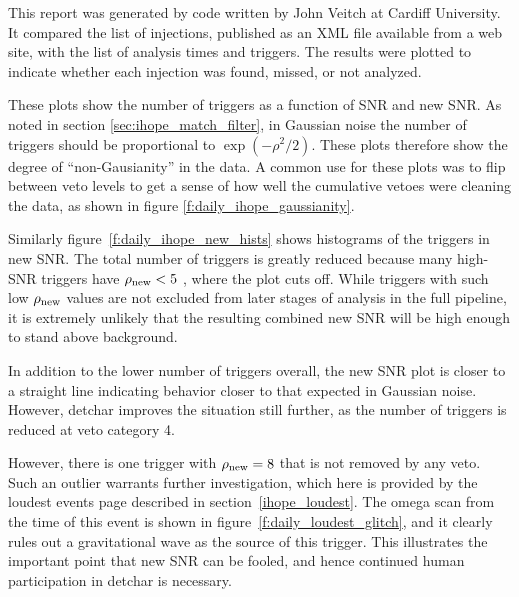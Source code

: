 
This report was generated by code written by John Veitch  at Cardiff
University.  It compared the list of injections, published as an XML
file available from a web site, with the list of analysis times and
triggers.  The results were plotted to indicate whether each injection
was found, missed, or not analyzed.



These plots show the number of triggers as a function of SNR and new
SNR.  As noted in section \ref{sec:ihope_match_filter}, in Gaussian
noise the number of triggers should be proportional to
$\exp(-\rho^2/2)$.  These plots therefore show the degree of
``non-Gausianity'' in the data.  A common use for these plots was to
flip between veto levels to get a sense of how well the cumulative
vetoes were cleaning the data, as shown in figure
\ref{f:daily_ihope_gaussianity}.

Similarly figure~\ref{f:daily_ihope_new_hists} shows histograms of the
triggers in new SNR.  The total number of triggers is greatly reduced
because many high-SNR triggers have $\rho_{\textrm{new}} < 5$ , where the
plot cuts off.  While triggers with such low $\rho_{\textrm{new}}$ values are not
excluded from later stages of analysis in the full pipeline, it is
extremely unlikely that the resulting combined new SNR will be high
enough to stand above background.

In addition to the lower number of triggers overall, the new SNR plot
is closer to a straight line indicating behavior closer to that
expected in Gaussian noise.  However, detchar improves the situation
still further, as the number of triggers is reduced at veto category
4.

However, there is one trigger with $\rho_{\textrm{new}} = 8$ that is not removed by
any veto.  Such an outlier warrants further investigation, which here
is provided by the loudest events page described in
section~\ref{ihope_loudest}.  The omega scan from the time of this
event is shown in figure~\ref{f:daily_loudest_glitch}, and it clearly
rules out a gravitational wave as the source of this trigger.  This
illustrates the important point that new SNR can be fooled, and hence
continued human participation in detchar is necessary.

